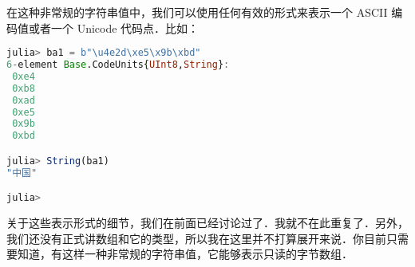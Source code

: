 在这种非常规的字符串值中，我们可以使用任何有效的形式来表示一个 ASCII 编码值或者一个 Unicode 代码点．比如：
\begin{lstlisting}[language=julia]
julia> ba1 = b"\u4e2d\xe5\x9b\xbd"
6-element Base.CodeUnits{UInt8,String}:
 0xe4
 0xb8
 0xad
 0xe5
 0x9b
 0xbd

julia> String(ba1)
"中国"

julia>
\end{lstlisting}

关于这些表示形式的细节，我们在前面已经讨论过了．我就不在此重复了．另外，我们还没有正式讲数组和它的类型，所以我在这里并不打算展开来说．你目前只需要知道，有这样一种非常规的字符串值，它能够表示只读的字节数组．